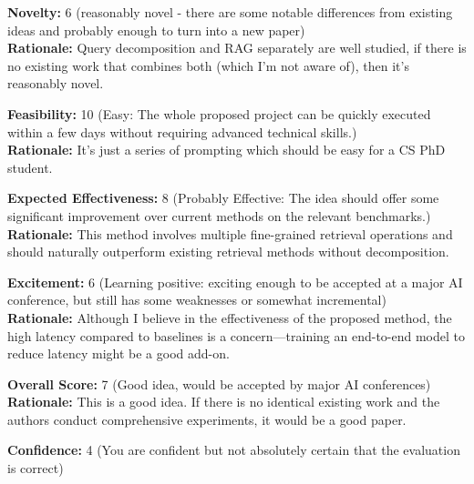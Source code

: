 \vspace{20pt}

\begin{tcolorbox}[colback=green!10!white, colframe=green!80!black, title=\textbf{Reviewer 2}]
\small
\textbf{Novelty:} 6 (reasonably novel - there are some notable differences from existing ideas and probably enough to turn into a new paper)\\
\textbf{Rationale:} Query decomposition and RAG separately are well studied, if there is no existing work that combines both (which I'm not aware of), then it's reasonably novel.

\vspace{10pt}

\textbf{Feasibility:} 10 (Easy: The whole proposed project can be quickly executed within a few days without requiring advanced technical skills.)\\
\textbf{Rationale:} It's just a series of prompting which should be easy for a CS PhD student.

\vspace{10pt}

\textbf{Expected Effectiveness:} 8 (Probably Effective: The idea should offer some significant improvement over current methods on the relevant benchmarks.)\\
\textbf{Rationale:} This method involves multiple fine-grained retrieval operations and should naturally outperform existing retrieval methods without decomposition.

\vspace{10pt}

\textbf{Excitement:} 6 (Learning positive: exciting enough to be accepted at a major AI conference, but still has some weaknesses or somewhat incremental)\\
\textbf{Rationale:} Although I believe in the effectiveness of the proposed method, the high latency compared to baselines is a concern—training an end-to-end model to reduce latency might be a good add-on.

\vspace{10pt}

\textbf{Overall Score:} 7 (Good idea, would be accepted by major AI conferences)\\
\textbf{Rationale:} This is a good idea. If there is no identical existing work and the authors conduct comprehensive experiments, it would be a good paper.

\vspace{10pt}

\textbf{Confidence:} 4 (You are confident but not absolutely certain that the evaluation is correct)
\end{tcolorbox}

